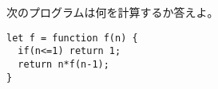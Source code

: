 \begin{Prob}\upshape
次のプログラムは何を計算するか答えよ。
\begin{Verbatim}
let f = function f(n) {
  if(n<=1) return 1;
  return n*f(n-1);
}
\end{Verbatim}
\end{Prob}
